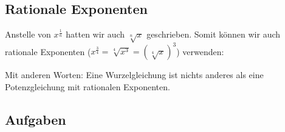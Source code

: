 \subsection{Rationale Exponenten}

Anstelle von $x^{\frac{1}{n}}$ hatten wir auch $\sqrt[n]{x}$
geschrieben.
Somit können wir auch rationale Exponenten ($x^{\frac{3}{4}}  = \sqrt[4]{x^{3}} = (\sqrt[4]x)^3$) verwenden:

Mit anderen Worten: Eine Wurzelgleichung ist nichts anderes als eine
Potenzgleichung mit rationalen Exponenten.



\subsection{Aufgaben}
